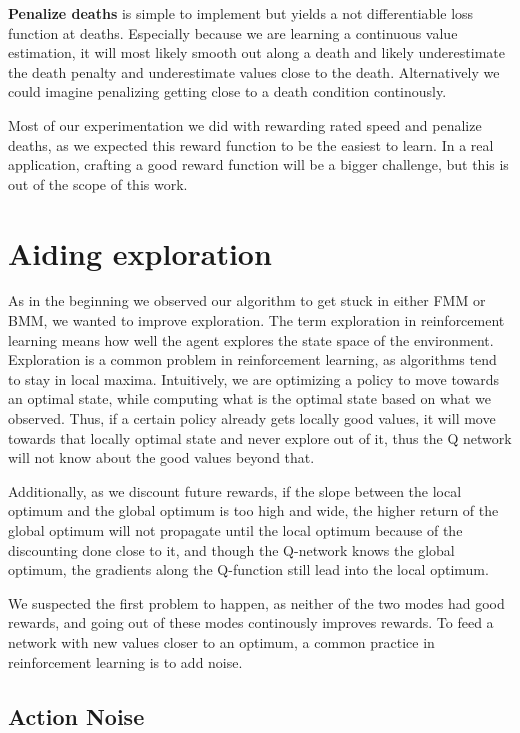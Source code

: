 \documentclass[hyperref,beleg]{cgvpub}
\begin{document}
\textbf{Penalize deaths} is simple to implement but yields a not differentiable loss function at deaths. Especially because we are learning a continuous value estimation, it will most likely smooth out along a death and likely underestimate the death penalty and underestimate values close to the death. Alternatively we could imagine penalizing getting close to a death condition continously.

Most of our experimentation we did with rewarding rated speed and penalize deaths, as we expected this reward function to be the easiest to learn. In a real application, crafting a good reward function will be a bigger challenge, but this is out of the scope of this work.

\section{Aiding exploration}

As in the beginning we observed our algorithm to get stuck in either \ac{FMM} or \ac{BMM}, we wanted to improve exploration. The term exploration in reinforcement learning means how well the agent explores the state space of the environment. Exploration is a common problem in reinforcement learning, as algorithms tend to stay in local maxima. Intuitively, we are optimizing a policy to move towards an optimal state, while computing what is the optimal state based on what we observed. Thus, if a certain policy already gets locally good values, it will move towards that locally optimal state and never explore out of it, thus the Q network will not know about the good values beyond that. 

Additionally, as we discount future rewards, if the slope between the local optimum and the global optimum is too high and wide, the higher return of the global optimum will not propagate until the local optimum because of the discounting done close to it, and though the Q-network knows the global optimum, the gradients along the Q-function still lead into the local optimum.

We suspected the first problem to happen, as neither of the two modes had good rewards, and going out of these modes continously improves rewards. To feed a network with new values closer to an optimum, a common practice in reinforcement learning is to add noise.

\subsection{Action Noise}
\end{document}
